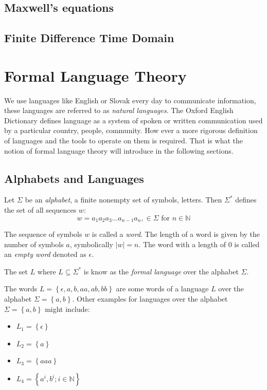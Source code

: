 \subsection*{Maxwell's equations}



\subsection*{Finite Difference Time Domain}
\section{Formal Language Theory}
We use languages like English or Slovak every day to communicate information, these languages are referred to as \emph{natural languages}. The Oxford English Dictionary defines language as a system of spoken or written communication used by a particular country, people, community. How ever a more rigorous definition of languages and the tools to operate on them is required. That is what the notion of formal language theory will introduce in the following sections.

\subsection{Alphabets and Languages}


\begin{definition}[Alphabet]
\label{def:alphabet}
Let $\Sigma$ be an \emph{alphabet}, a finite nonempty set of symbols, letters. Then $\Sigma ^{*}$ defines the set of all sequences $w$:
$$w= a_1 a_2 a_3 \dots a_{n-1} a_n, \in \Sigma \text{ for } n \in \mathbb{N}$$
\end{definition}

The sequence of symbols $w$ is called a \emph{word}. The length of a word is given by the number of symbols $a$, symbolically $|w| = n$. The word with a length of 0 is called an \emph{empty word} denoted as $\epsilon$.

\begin{definition}[Language]
\label{def:language}
The set $L$ where $L\subseteq \Sigma^{*}$ is know as the \emph{formal language} over the alphabet $\Sigma$. 
\end{definition}
The words $L = \left\lbrace \epsilon, a, b, aa, ab, bb \right\rbrace$ are some words of a language $L$ over the alphabet $\Sigma=\left\lbrace a,b \right\rbrace$.
Other examples for languages over the alphabet $\Sigma=\left\lbrace a,b \right\rbrace$ might include:
\begin{itemize}
\item $L_1 = \left\lbrace \epsilon \right\rbrace$
\item $L_2 = \left\lbrace a \right\rbrace$
\item $L_3 = \left\lbrace aaa \right\rbrace$
\item $L_4 = \left\lbrace a^i,b^i; i \in \mathbb{N} \right\rbrace$
\end{itemize}




